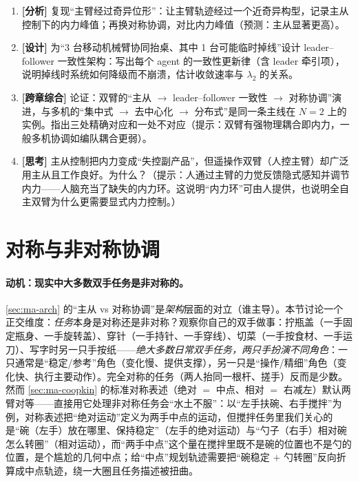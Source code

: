 \begin{exercise}
\begin{enumerate}
  \item \textbf{[分析]} 复现“主臂经过奇异位形”：让主臂轨迹经过一个近奇异构型，记录主从控制下的内力峰值；再换对称协调，对比内力峰值（预测：主从显著更高）。
  \item \textbf{[设计]} 为“3 台移动机械臂协同抬桌、其中 1 台可能临时掉线”设计 leader--follower 一致性架构：写出每个 agent 的一致性更新律（含 leader 牵引项），说明掉线时系统如何降级而不崩溃，估计收敛速率与 $\lambda_2$ 的关系。
  \item \textbf{[跨章综合]} 论证：双臂的“主从 $\to$ leader--follower 一致性 $\to$ 对称协调”演进，与多机的“集中式 $\to$ 去中心化 $\to$ 分布式”是同一条主线在 $N=2$ 上的实例。指出三处精确对应和一处不对应（提示：双臂有强物理耦合即内力，一般多机协调如编队耦合更弱）。
  \item \textbf{[思考]} 主从控制把内力变成“失控副产品”，但遥操作双臂（人控主臂）却广泛用主从且工作良好。为什么？（提示：人通过主臂的力觉反馈隐式感知并调节内力——人脑充当了缺失的内力环。这说明“内力环”可由人提供，也说明全自主双臂为什么更需要显式内力控制。）
\end{enumerate}
\end{exercise}

\section{对称与非对称协调}
\label{sec:ma-symmetry}

\paragraph{动机：现实中大多数双手任务是非对称的。}
\cref{sec:ma-arch} 的“主从 vs 对称协调”是\emph{架构}层面的对立（谁主导）。本节讨论一个正交维度：\emph{任务}本身是对称还是非对称？观察你自己的双手做事：拧瓶盖（一手固定瓶身、一手旋转盖）、穿针（一手持针、一手穿线）、切菜（一手按食材、一手运刀）、写字时另一只手按纸——\emph{绝大多数日常双手任务，两只手扮演不同角色}：一只通常是“稳定/参考”角色（变化慢、提供支撑），另一只是“操作/精细”角色（变化快、执行主要动作）。完全对称的任务（两人抬同一根杆、搓手）反而是少数。然而 \cref{sec:ma-coopkin} 的标准对称表述（绝对 $=$ 中点、相对 $=$ 右减左）默认两臂对等——直接用它处理非对称任务会“水土不服”：以“左手扶碗、右手搅拌”为例，对称表述把“绝对运动”定义为两手中点的运动，但搅拌任务里我们关心的是“碗（左手）放在哪里、保持稳定”（左手的绝对运动）与“勺子（右手）相对碗怎么转圈”（相对运动），而“两手中点”这个量在搅拌里既不是碗的位置也不是勺的位置，是个尴尬的几何中点；给“中点”规划轨迹需要把“碗稳定 $+$ 勺转圈”反向折算成中点轨迹，绕一大圈且任务描述被扭曲。

